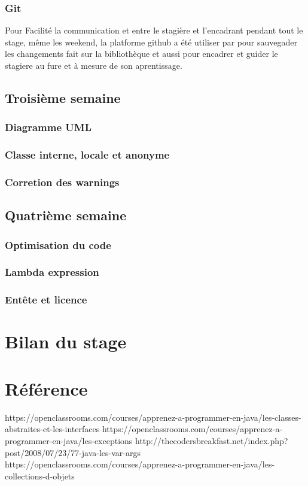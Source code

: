 \documentclass[12pt]{article}
\begin{document}
\newpage
\subsubsection{Git}
Pour Facilité la communication et entre le stagière et l'encadrant pendant tout le stage, même les weekend, la platforme github a été utiliser par pour sauvegader les changements fait sur la bibliothèque et aussi pour encadrer et guider le stagiere au fure et à mesure de son aprentissage.

\subsection{Troisième semaine}
\subsubsection{Diagramme UML}
\subsubsection{Classe interne, locale et anonyme}
\subsubsection{Corretion des warnings}

\subsection{Quatrième semaine}
\subsubsection{Optimisation du code}
\subsubsection{Lambda expression}
\subsubsection{Entête et licence}

\section{Bilan du stage}

\newpage
\section{Référence}
https://openclassrooms.com/courses/apprenez-a-programmer-en-java/les-classes-abstraites-et-les-interfaces
https://openclassrooms.com/courses/apprenez-a-programmer-en-java/les-exceptions
http://thecodersbreakfast.net/index.php?post/2008/07/23/77-java-les-var-args
https://openclassrooms.com/courses/apprenez-a-programmer-en-java/les-collections-d-objets
\end{document}

